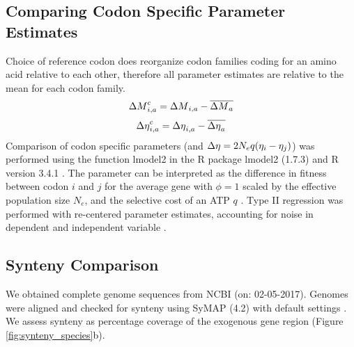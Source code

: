 \subsection{Comparing Codon Specific Parameter Estimates}
Choice of reference codon does reorganize codon families coding for an amino acid relative to each other, therefore all parameter estimates are relative to the mean for each codon family.
\begin{equation}
{\Delta M}_{i,a}^c = {\Delta M}_{i,a} - \overline{{\Delta M}_a}
\end{equation}
\begin{equation}
{\Delta \eta}_{i,a}^c = {\Delta \eta}_{i,a} - \overline{{\Delta \eta}_a}
\end{equation}
Comparison of codon specific parameters (\DM and ${\Delta \eta} = 2N_eq(\eta_i-\eta_j)$) was performed using the function lmodel2 in the R package lmodel2 (1.7.3) \citep{lmodel2} and R version 3.4.1 \citep{rcore}.
The parameter \DE can be interpreted as the difference in fitness between codon $i$ and $j$ for the average gene with $\phi = 1$ scaled by the  effective population size $N_e$, and the selective cost of an ATP $q$ \citep{gilchrist2007, gilchrist2015}.
Type II regression was performed with re-centered parameter estimates, accounting for noise in dependent and independent variable \citep{SokalAndRohlf1981}.

\subsection{Synteny Comparison}
We obtained complete genome sequences from NCBI (on: 02-05-2017).
Genomes were aligned and checked for synteny using SyMAP (4.2) with default settings \citep{soderlund2006, soderlund2011}.
We assess synteny as percentage coverage of the exogenous gene region (Figure \ref{fig:synteny_species}b).

